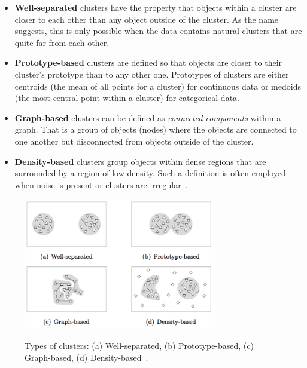 \begin{itemize}

\item \textbf{Well-separated} clusters have the property that objects within a cluster are closer to each other than any object outside of the cluster. As the name suggests, this is only possible when the data contains natural clusters that are quite far from each other.

\item \textbf{Prototype-based} clusters are defined so that objects are closer to their cluster's prototype than to any other one. Prototypes of clusters are either centroids (the mean of all points for a cluster) for continuous data or medoids (the most central point within a cluster) for categorical data.

\item \textbf{Graph-based} clusters can be defined as \emph{connected components} within a graph. That is a group of objects (nodes) where the objects are connected to one another but disconnected from objects outside of the cluster.

\item \textbf{Density-based} clusters group objects within dense regions that are surrounded by a region of low density. Such a definition is often employed when noise is present or clusters are irregular~\cite{Meert06clustermaps}.

\end{itemize}

\begin{figure}[h]
  \begin{center}
    \includegraphics[width=0.75\textwidth]{figures/cluster_types.png}
    \label{fig:clusters}
    \caption{Types of clusters: (a) Well-separated, (b) Prototype-based, (c) Graph-based, (d) Density-based~\cite[p 9]{Meert06clustermaps}.}
  \end{center}
\end{figure}

